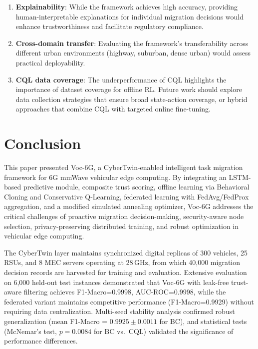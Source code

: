 \documentclass[journal,twoside]{IEEEtran}
\newcommand{\VocSixG}{Voc-6G}
\begin{document}
\begin{enumerate}
    \item \textbf{Explainability}: While the framework achieves high accuracy, providing human-interpretable explanations for individual migration decisions would enhance trustworthiness and facilitate regulatory compliance.

    \item \textbf{Cross-domain transfer}: Evaluating the framework's transferability across different urban environments (highway, suburban, dense urban) would assess practical deployability.

    \item \textbf{CQL data coverage}: The underperformance of CQL highlights the importance of dataset coverage for offline RL. Future work should explore data collection strategies that ensure broad state-action coverage, or hybrid approaches that combine CQL with targeted online fine-tuning.
\end{enumerate}


\section{Conclusion}
\label{sec:conclusion}

This paper presented \VocSixG{}, a CyberTwin-enabled intelligent task migration framework for 6G mmWave vehicular edge computing. By integrating an LSTM-based predictive module, composite trust scoring, offline learning via Behavioral Cloning and Conservative Q-Learning, federated learning with FedAvg/FedProx aggregation, and a modified simulated annealing optimizer, \VocSixG{} addresses the critical challenges of proactive migration decision-making, security-aware node selection, privacy-preserving distributed training, and robust optimization in vehicular edge computing.

The CyberTwin layer maintains synchronized digital replicas of 300 vehicles, 25 RSUs, and 8 MEC servers operating at 28\,GHz, from which 40,000 migration decision records are harvested for training and evaluation. Extensive evaluation on 6,000 held-out test instances demonstrated that \VocSixG{} with leak-free trust-aware filtering achieves F1-Macro=0.9998, AUC-ROC=0.9998, while the federated variant maintains competitive performance (F1-Macro=0.9929) without requiring data centralization. Multi-seed stability analysis confirmed robust generalization (mean F1-Macro = $0.9925 \pm 0.0011$ for BC), and statistical tests (McNemar's test, $p=0.0084$ for BC vs.\ CQL) validated the significance of performance differences.
\end{document}
